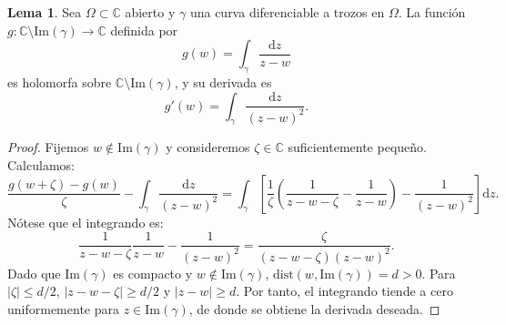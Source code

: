 \documentclass[11pt,a4paper]{article}
\theoremstyle{definition}
\newtheorem{lema}{Lema}[section]
\theoremstyle{remark}
\numberwithin{equation}{section}
\newcommand{\dz}{\mathrm{d}z}
\begin{document}
\begin{lema}
Sea $\Omega \subset \mathbb{C}$ abierto y $\gamma$ una curva diferenciable a trozos en $\Omega$. La función $g: \mathbb{C} \setminus \mathrm{Im}(\gamma) \to \mathbb{C}$ definida por
\begin{equation}
g(w) = \int_\gamma \frac{\dz}{z - w}
\end{equation}
es holomorfa sobre $\mathbb{C} \setminus \mathrm{Im}(\gamma)$, y su derivada es
\begin{equation}
g'(w) = \int_\gamma \frac{\dz}{(z - w)^2}.
\end{equation}
\end{lema}
\begin{proof}
Fijemos $w \notin \mathrm{Im}(\gamma)$ y consideremos $\zeta \in \mathbb{C}$ suficientemente pequeño. Calculamos:
\[
\frac{g(w+\zeta) - g(w)}{\zeta} - \int_\gamma \frac{\dz}{(z-w)^2} = \int_\gamma \left[ \frac{1}{\zeta}\left( \frac{1}{z-w-\zeta} - \frac{1}{z-w} \right) - \frac{1}{(z-w)^2} \right] \dz.
\]
Nótese que el integrando es:
\[
\frac{1}{z-w-\zeta} \frac{1}{z-w} - \frac{1}{(z-w)^2} = \frac{\zeta}{(z-w-\zeta)(z-w)^2}.
\]
Dado que $\mathrm{Im}(\gamma)$ es compacto y $w \notin \mathrm{Im}(\gamma)$, $\mathrm{dist}(w, \mathrm{Im}(\gamma)) = d > 0$. Para $|\zeta| \le d/2$, $|z-w-\zeta| \ge d/2$ y $|z-w| \ge d$. Por tanto, el integrando tiende a cero uniformemente para $z \in \mathrm{Im}(\gamma)$, de donde se obtiene la derivada deseada.
\end{proof}
\end{document}
